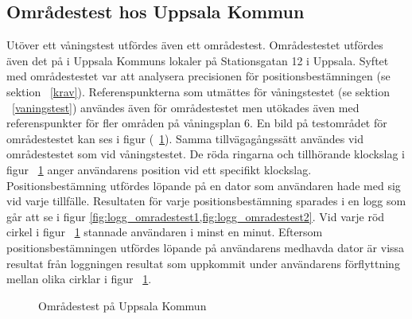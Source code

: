 \documentclass[a4paper,12pt]{article}
\begin{document}
 \subsection{Områdestest hos Uppsala Kommun}
 Utöver ett våningstest utfördes även ett områdestest. Områdestestet utfördes även det på i Uppsala Kommuns lokaler på Stationsgatan 12 i Uppsala. Syftet med områdestestet var att analysera precisionen för positionsbestämningen (se sektion ~\ref{krav}). Referenspunkterna som utmättes för våningstestet (se sektion ~\ref{vaningstest}) användes även för områdestestet men utökades även med referenspunkter för fler områden på våningsplan 6. En bild på testområdet för områdestestet kan ses i figur (~\ref{fig:omrades_test}). Samma tillvägagångssätt användes vid områdestestet som vid våningstestet. De röda ringarna och tillhörande klockslag i figur ~\ref{fig:omrades_test} anger användarens position vid ett specifikt klockslag. Positionsbestämning utfördes löpande på en dator som användaren hade med sig vid varje tillfälle. Resultaten för varje positionsbestämning sparades i en logg som går att se i figur \cref{fig:logg_omradestest1,fig:logg_omradestest2}. Vid varje röd cirkel i figur ~\ref{fig:omrades_test} stannade användaren i minst en minut. Eftersom positionsbestämningen utfördes löpande på användarens medhavda dator är vissa resultat från loggningen resultat som uppkommit under användarens förflyttning mellan olika cirklar i figur ~\ref{fig:omrades_test}.

 \begin{figure}[H]
   \centering
   \caption{Områdestest på Uppsala Kommun}
   \label{fig:omrades_test}
 \end{figure}
\end{document}
